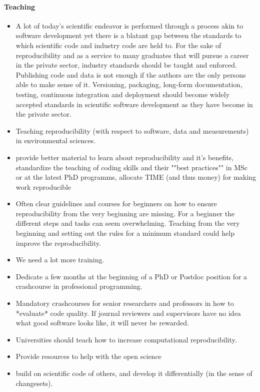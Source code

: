 \documentclass{article}
\begin{document}
\paragraph{Teaching}
\begin{itemize}
	\item A lot of today's scientific endeavor is performed through a process akin to software development yet there is a blatant gap between the standards to which scientific code and industry code are held to. For the sake of reproducibility and as a service to many graduates that will pursue a career in the private sector, industry standards should be taught and enforced. Publishing code and data is not enough if the authors are the only persons able to make sense of it. Versioning, packaging, long-form documentation, testing, continuous integration and deployment should become widely accepted standards in scientific software development as they have become in the private sector.
	\item Teaching reproducibility (with respect to software, data and measurements) in environmental sciences.
	\item provide better material to learn about reproducibility and it's benefits, standardize the teaching of coding skills and their ""best practices"" in MSc or at the latest PhD programms, allocate TIME (and thus money) for making work reproducible
	\item Often clear guidelines and courses for beginners on how to ensure reproducibility from the very beginning are missing. For a beginner the different steps and tasks can seem overwhelming. Teaching from the very beginning and setting out the rules for a minimum standard could help improve the reproducibility.
	\item We need a lot more training. 
	\item Dedicate a few months at the beginning of a PhD or Postdoc position for a crashcourse in professional programming.
	\item Mandatory crashcourses for senior researchers and professors in how to *evaluate* code quality. If journal reviewers and supervisors have no idea what good software looks like, it will never be rewarded.
	\item Universities should teach how to increase computational reproducibility.
	\item Provide resources to help with the open science
	\item build on scientific code of others, and develop it differentially (in the sense of changesets).

\end{itemize}
\end{document}
